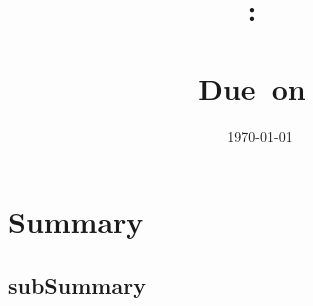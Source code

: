 \documentclass{article}
\title{
    \vspace{2in}
    \textmd{\textbf{\hmwkClass:\ \\ \hmwkTitle}}\\
    \normalsize\vspace{0.1in}\small{Due\ on\ \hmwkDueDate}\\
    \vspace{0.1in}\Large{\textit{\paprTitle}}
    \vspace{3in}
}
\author{\hmwkAuthorName}
\date{\today}
\begin{document}
\maketitle

\pagebreak

\section{Summary}

\lipsum[4]

\subsection{subSummary}

\lipsum[2-3]

\begin{multicols}{2}

\lipsum[1]

\end{multicols}

\lipsum[2-3]

\end{document}
